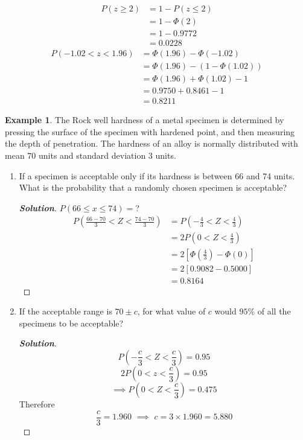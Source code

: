 \documentclass[12pt,a4paper]{report}
\theoremstyle{definition}
\newtheorem{example}[thm]{Example}
\theoremstyle{plain}
\theoremstyle{definition}
\begin{document}
\begin{align*}
P(z\geq 2) & = 1-P(z\leq 2)\\
           & = 1-\Phi(2)\\
           & = 1-0.9772\\
           & = 0.0228
\end{align*}
\begin{align*}
P(-1.02<z<1.96) & = \Phi(1.96)-\Phi(-1.02)\\
                & = \Phi(1.96)-(1-\Phi(1.02))\\
                & = \Phi(1.96)+\Phi(1.02)-1\\
                & = 0.9750+0.8461-1\\
                & = 0.8211
\end{align*}


\begin{example}
The Rock well hardness of a metal specimen is determined by pressing the surface of the specimen with hardened point, and then measuring the depth of penetration. The hardness of an alloy is normally distributed with mean 70 units and standard deviation 3 units.

\begin{enumerate}
\item If a specimen is acceptable only if its hardness is between 66 and 74 units. What is the probability that a randomly chosen specimen is acceptable?
\begin{proof}[\textbf{\textit{Solution}}]
 $P(66\leq x\leq 74)= $?
\begin{align*}
P\left(\frac{66-70}{3}< Z <\frac{74-70}{3}\right) & = P\left(-\frac{4}{3}< Z <\frac{4}{3}\right)\\
                                               & = 2P\left(0 < Z <\frac{4}{3}\right)\\
                                               & = 2\left[\Phi\left(\frac{4}{3}\right)-\Phi(0)\right]\\
                                               & = 2[0.9082-0.5000]\\
                                               & = 0.8164
\end{align*}
\end{proof}




\item If the acceptable range is $70\pm c$, for what value of $c$ would $95\%$ of all the specimens to be acceptable?
\begin{proof}[\textbf{\textit{Solution}}]
\[P\left(-\frac{c}{3}< Z <\frac{c}{3}\right)  = 0.95\]
\[2P\left(0<z<\frac{c}{3}\right)  = 0.95\]
\[\implies P\left(0< Z <\frac{c}{3}\right)  = 0.475\]
Therefore
\[\frac{c}{3} =1.960\, \, \implies\,\,  c=3\times 1.960=5.880\]







\end{proof}
\end{enumerate}
\end{example}
\end{document}
